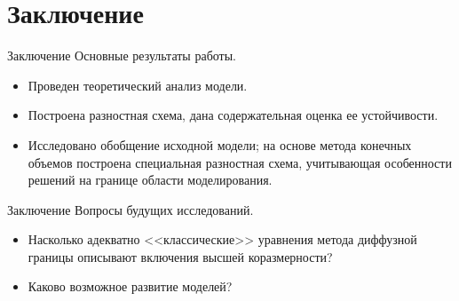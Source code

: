 
\section{Заключение}

\begin{frame}{Заключение}
Основные результаты работы.
\begin{itemize}
    \item Проведен теоретический анализ модели.
    \item Построена разностная схема, дана содержательная оценка ее устойчивости.
    \item Исследовано обобщение исходной модели; на основе метода конечных объемов построена специальная разностная схема, учитывающая особенности решений на границе области моделирования.
\end{itemize}
\end{frame}

\begin{frame}{Заключение}
Вопросы будущих исследований.
\begin{itemize}
    \item Насколько адекватно <<классические>> уравнения метода диффузной границы описывают включения высшей коразмерности?
    \item Каково возможное развитие моделей?
\end{itemize}
\end{frame}